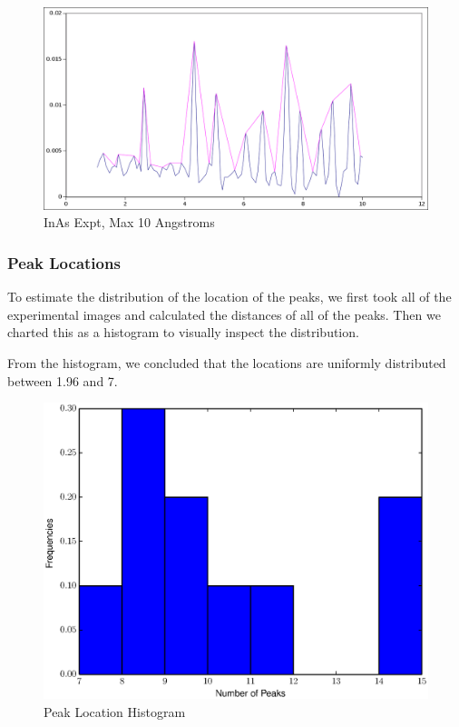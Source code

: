 \documentclass[12pt,letterpaper]{article}
\begin{document}
\begin{figure}[ht]
  \begin{center}
    \includegraphics[scale=0.4]{figs/inas_peaks_10ang.png}
    \caption{InAs Expt, Max 10 Angstroms}
  \end{center}
\end{figure}
\clearpage

\subsubsection{Peak Locations}
To estimate the distribution of the location of the peaks, we first took all of
the experimental images and calculated the distances of all of the peaks. Then
we charted this as a histogram to visually inspect the distribution.

From the histogram, we concluded that the locations are uniformly distributed
between 1.96 and 7.
\begin{figure}[ht]
  \begin{center}
    \includegraphics[scale=0.8]{figs/peak_counts_hist.eps}
    \caption{Peak Location Histogram}
  \end{center}
\end{figure}
\clearpage
\end{document}

